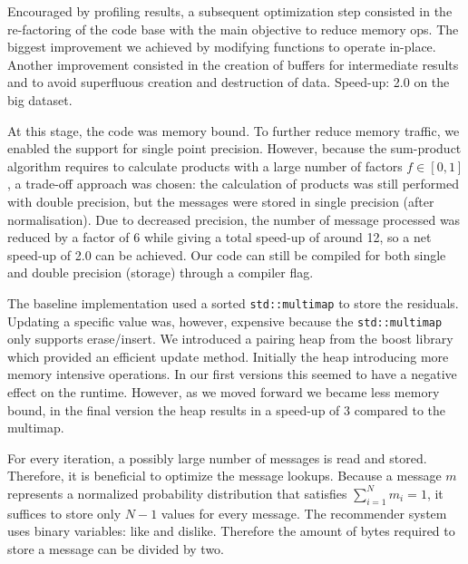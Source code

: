 
Encouraged by profiling results, a subsequent optimization step consisted in the re-factoring of the code base with the main objective to reduce memory ops. The biggest improvement we achieved by modifying functions to operate in-place. Another improvement consisted in the creation of buffers for intermediate results and to avoid superfluous creation and destruction of data. 
Speed-up: 2.0 on the big dataset.

At this stage, the code was memory bound. To further reduce memory traffic, we enabled the support for single point precision. However, because the sum-product algorithm requires to calculate products with a large number of factors $f \in [0,1]$, a trade-off approach was chosen: the calculation of products was still performed with double precision, but the messages were stored in single precision (after normalisation). Due to decreased precision, the number of message processed was reduced by a factor of 6 while giving a total speed-up of around 12, so a net speed-up of 2.0 can be achieved. Our code can still be compiled for both single and double precision (storage) through a compiler flag.

The baseline implementation used a sorted \texttt{std::multimap} to store the residuals. Updating a specific value was, however, expensive because the \texttt{std::multimap} only supports erase/insert. We introduced a pairing heap from the boost library which provided an efficient update method. Initially the heap introducing more memory intensive operations. In our first versions this seemed to have a negative effect on the runtime. However, as we moved forward we became less memory bound, in the final version the heap results in a speed-up of 3 compared to the multimap.

For every iteration, a possibly large number of messages is read and stored. Therefore, it is beneficial to optimize the message lookups. Because a message $m$ represents a normalized probability distribution that satisfies $\sum_{i=1}^N m_i = 1$, it suffices to store only $N-1$ values for every message. The re\-commender system uses binary variables:  like and dislike. Therefore the amount of bytes required to store a message can be divided by two. 

